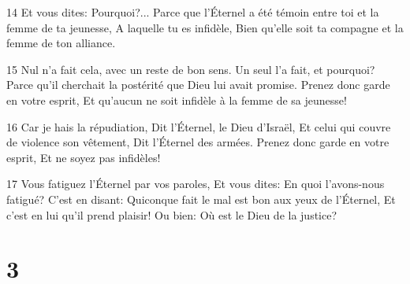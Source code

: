 \par 14 Et vous dites: Pourquoi?... Parce que l'Éternel a été témoin entre toi et la femme de ta jeunesse, A laquelle tu es infidèle, Bien qu'elle soit ta compagne et la femme de ton alliance.
\par 15 Nul n'a fait cela, avec un reste de bon sens. Un seul l'a fait, et pourquoi? Parce qu'il cherchait la postérité que Dieu lui avait promise. Prenez donc garde en votre esprit, Et qu'aucun ne soit infidèle à la femme de sa jeunesse!
\par 16 Car je hais la répudiation, Dit l'Éternel, le Dieu d'Israël, Et celui qui couvre de violence son vêtement, Dit l'Éternel des armées. Prenez donc garde en votre esprit, Et ne soyez pas infidèles!
\par 17 Vous fatiguez l'Éternel par vos paroles, Et vous dites: En quoi l'avons-nous fatigué? C'est en disant: Quiconque fait le mal est bon aux yeux de l'Éternel, Et c'est en lui qu'il prend plaisir! Ou bien: Où est le Dieu de la justice?

\chapter{3}


